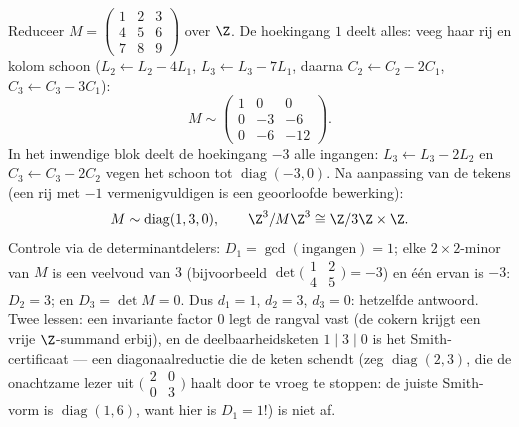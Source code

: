 \begin{example}
\label{ex:b3:modules:smithworked}
Reduceer $M = \begin{pmatrix} 1 & 2 & 3\\ 4 & 5 & 6\\ 7 & 8 & 9
\end{pmatrix}$ over $\Z$. De hoekingang $1$ deelt alles: veeg
haar rij en kolom schoon ($L_2 \leftarrow L_2 - 4L_1$, $L_3
\leftarrow L_3 - 7L_1$, daarna $C_2 \leftarrow C_2 - 2C_1$, $C_3
\leftarrow C_3 - 3C_1$):
\[
M \sim \begin{pmatrix} 1 & 0 & 0\\ 0 & -3 & -6\\ 0 & -6 & -12
\end{pmatrix} .
\]
In het inwendige blok deelt de hoekingang $-3$ alle ingangen:
$L_3 \leftarrow L_3 - 2L_2$ en $C_3 \leftarrow C_3 - 2C_2$ vegen
het schoon tot $\operatorname{diag}(-3, 0)$. Na aanpassing van de
tekens (een rij met $-1$ vermenigvuldigen is een geoorloofde
bewerking):
\[
M \sim \operatorname{diag}(1, 3, 0),
\qquad
\Z^3/M\Z^3 \cong \Z/3\Z \times \Z .
\]
Controle via de determinantdelers: $D_1 = \gcd(\text{ingangen})
= 1$; elke $2\times2$-minor van $M$ is een veelvoud van $3$
(bijvoorbeeld $\det\bigl(\begin{smallmatrix}1 & 2\\ 4 &
5\end{smallmatrix}\bigr) = -3$) en één ervan is $-3$: $D_2 = 3$;
en $D_3 = \det M = 0$. Dus $d_1 = 1$, $d_2 = 3$, $d_3 = 0$:
hetzelfde antwoord. Twee lessen: een invariante factor $0$ legt
de rangval vast (de cokern krijgt een vrije $\Z$-summand erbij),
en de deelbaarheidsketen $1 \mid 3 \mid 0$ is het
Smith-certificaat --- een diagonaalreductie die de keten schendt
(zeg $\operatorname{diag}(2, 3)$, die de onachtzame lezer uit
$\bigl(\begin{smallmatrix}2 & 0\\ 0 &
3\end{smallmatrix}\bigr)$ haalt door te vroeg te stoppen: de
juiste Smith-vorm is $\operatorname{diag}(1, 6)$, want hier is
$D_1 = 1$!) is niet af.
\end{example}

